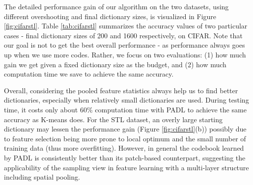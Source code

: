 The detailed performance gain of our algorithm on the two datasets, using different overshooting and final dictionary sizes, is visualized in Figure \ref{fig:cifarstl}. Table \ref{tab:cifarstl} summarizes the accuracy values of two particular cases - final dictionary sizes of 200 and 1600 respectively, on CIFAR. Note that our goal is not to get the best overall performance - as performance always goes up when we use more codes. Rather, we focus on two evaluations: (1) how much gain we get given a fixed dictionary size as the budget, and (2) how much computation time we save to achieve the same accuracy.

Overall, considering the pooled feature statistics always help us to find better dictionaries, especially when relatively small dictionaries are used. During testing time, it costs only about 60\% computation time with PADL to achieve the same accuracy as K-means does. For the STL dataset, an overly large starting dictionary may lessen the performance gain (Figure \ref{fig:cifarstl}(b)) possibly due to feature selection being more prone to local optimum and the small number of training data (thus more overfitting). However, in general the codebook learned by PADL is consistently better than its patch-based counterpart, suggesting the applicability of the \nystrom sampling view in feature learning with a multi-layer structure including spatial pooling.

